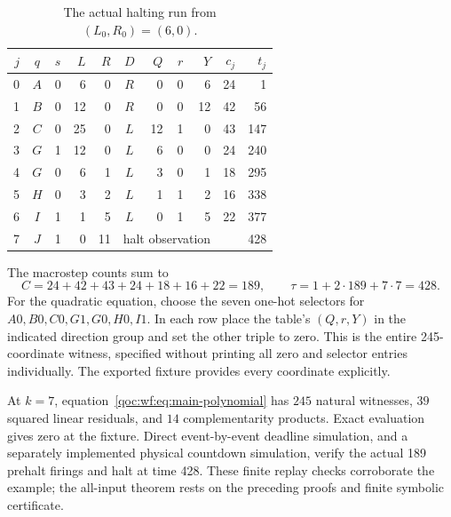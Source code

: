 \documentclass[11pt,letterpaper]{article}
\theoremstyle{definition}
\theoremstyle{remark}
\begin{document}
\begin{table}[htbp]
\centering
\caption{The actual halting run from $(L_0,R_0)=(6,0)$.}\label{qoc:wf:tab:example}
\begin{tabular}{@{}r cc rr c rrr rr@{}}
\toprule
$j$ &$q$ &$s$ &$L$ &$R$ &$D$ &$Q$ &$r$ &$Y$ &$c_j$ &$t_j$\\\midrule
0 & $A$ & 0 & 6 & 0 & $R$ & 0 & 0 & 6 & 24 & 1\\
1 & $B$ & 0 & 12 & 0 & $R$ & 0 & 0 & 12 & 42 & 56\\
2 & $C$ & 0 & 25 & 0 & $L$ & 12 & 1 & 0 & 43 & 147\\
3 & $G$ & 1 & 12 & 0 & $L$ & 6 & 0 & 0 & 24 & 240\\
4 & $G$ & 0 & 6 & 1 & $L$ & 3 & 0 & 1 & 18 & 295\\
5 & $H$ & 0 & 3 & 2 & $L$ & 1 & 1 & 2 & 16 & 338\\
6 & $I$ & 1 & 1 & 5 & $L$ & 0 & 1 & 5 & 22 & 377\\\midrule
7 & $J$ & 1 & 0 & 11 & \multicolumn{4}{c}{halt observation} & & 428\\\bottomrule
\end{tabular}
\end{table}

The macrostep counts sum to
\[
 C=24+42+43+24+18+16+22=189,
 \qquad \tau=1+2\cdot189+7\cdot7=428.
\]
For the quadratic equation, choose the seven one-hot selectors for $A0,B0,C0,G1,G0,H0,I1$. In each row place the table's $(Q,r,Y)$ in the indicated direction group and set the other triple to zero. This is the entire 245-coordinate witness, specified without printing all zero and selector entries individually. The exported fixture provides every coordinate explicitly.

At $k=7$, equation~\eqref{qoc:wf:eq:main-polynomial} has $245$ natural witnesses, $39$ squared linear residuals, and $14$ complementarity products. Exact evaluation gives zero at the fixture. Direct event-by-event deadline simulation, and a separately implemented physical countdown simulation, verify the actual 189 prehalt firings and halt at time 428. These finite replay checks corroborate the example; the all-input theorem rests on the preceding proofs and finite symbolic certificate.
\end{document}
